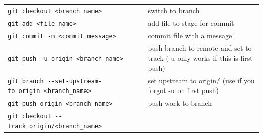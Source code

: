 \documentclass[]{book}
\begin{document}
\begin{longtable}[]{@{}ll@{}}
\begin{minipage}[t]{0.34\columnwidth}
\texttt{git\ checkout\ \textless{}branch\ name\textgreater{}}\strut
\end{minipage} & \begin{minipage}[t]{0.60\columnwidth}\raggedright
switch to branch\strut
\end{minipage}\tabularnewline
\begin{minipage}[t]{0.34\columnwidth}\raggedright
\texttt{git\ add\ \textless{}file\ name\textgreater{}}\strut
\end{minipage} & \begin{minipage}[t]{0.60\columnwidth}\raggedright
add file to stage for commit\strut
\end{minipage}\tabularnewline
\begin{minipage}[t]{0.34\columnwidth}\raggedright
\texttt{git\ commit\ -m\ \textless{}commit\ message\textgreater{}}\strut
\end{minipage} & \begin{minipage}[t]{0.60\columnwidth}\raggedright
commit file with a message\strut
\end{minipage}\tabularnewline
\begin{minipage}[t]{0.34\columnwidth}\raggedright
\texttt{git\ push\ -u\ origin\ \textless{}branch\_name\textgreater{}}\strut
\end{minipage} & \begin{minipage}[t]{0.60\columnwidth}\raggedright
push branch to remote and set to track (-u only works if this is first push)\strut
\end{minipage}\tabularnewline
\begin{minipage}[t]{0.34\columnwidth}\raggedright
\texttt{git\ branch\ -\/-set-upstream-to\ origin\ \textless{}branch\_name\textgreater{}}\strut
\end{minipage} & \begin{minipage}[t]{0.60\columnwidth}\raggedright
set upstream to origin/ (use if you forgot -u on first push)\strut
\end{minipage}\tabularnewline
\begin{minipage}[t]{0.34\columnwidth}\raggedright
\texttt{git\ push\ origin\ \textless{}branch\_name\textgreater{}}\strut
\end{minipage} & \begin{minipage}[t]{0.60\columnwidth}\raggedright
push work to branch\strut
\end{minipage}\tabularnewline
\begin{minipage}[t]{0.34\columnwidth}\raggedright
\texttt{git\ checkout\ -\/-track\ origin/\textless{}branch\_name\textgreater{}}\strut

\end{minipage}
\end{longtable}
\end{document}
